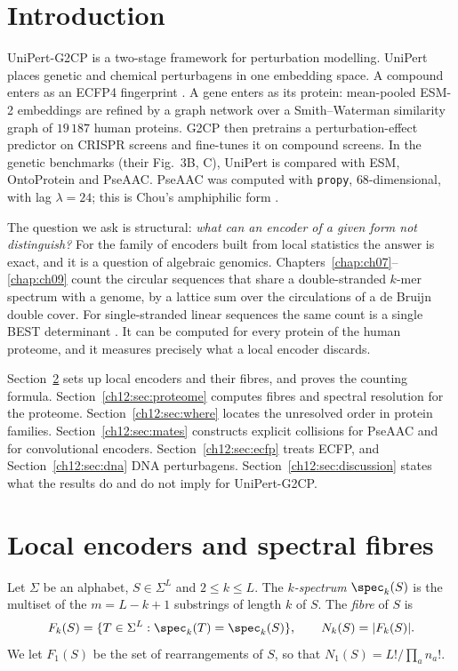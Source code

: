 \section{Introduction}\label{ch12:sec:intro}

UniPert-G2CP \cite{UniPert} is a two-stage framework for perturbation modelling. UniPert places genetic
and chemical perturbagens in one embedding space. A compound enters as an ECFP4 fingerprint
\cite{RH10}. A gene enters as its protein: mean-pooled ESM-2 embeddings \cite{ESM2} are refined by a
graph network over a Smith--Waterman similarity graph of $19\,187$ human proteins. G2CP then pretrains a
perturbation-effect predictor on CRISPR screens and fine-tunes it on compound screens. In the genetic
benchmarks (their Fig.~3B, C), UniPert is compared with ESM, OntoProtein and PseAAC. PseAAC was computed
with \texttt{propy}, $68$-dimensional, with lag $\lambda=24$; this is Chou's amphiphilic form
\cite{Chou01,Chou05}.

The question we ask is structural: \emph{what can an encoder of a given form not distinguish?} For
the family of encoders built from local statistics the answer is exact, and it is a question of
algebraic genomics. Chapters~\ref{chap:ch07}--\ref{chap:ch09} count the circular sequences that share a double-stranded
$k$-mer spectrum with a genome, by a lattice sum over the circulations of a de Bruijn double cover. For single-stranded linear sequences the same count is a single BEST
determinant \cite{BEST}. It can be computed for every protein of the human proteome, and it measures
precisely what a local encoder discards.

Section~\ref{ch12:sec:fibres} sets up local encoders and their fibres, and proves the counting formula.
Section~\ref{ch12:sec:proteome} computes fibres and spectral resolution for the proteome.
Section~\ref{ch12:sec:where} locates the unresolved order in protein families. Section~\ref{ch12:sec:mates}
constructs explicit collisions for PseAAC and for convolutional encoders. Section~\ref{ch12:sec:ecfp}
treats ECFP, and Section~\ref{ch12:sec:dna} DNA perturbagens. Section~\ref{ch12:sec:discussion} states what
the results do and do not imply for UniPert-G2CP.

\section{Local encoders and spectral fibres}\label{ch12:sec:fibres}

Let $\Sigma$ be an alphabet, $S\in\Sigma^L$ and $2\le k\le L$. The \emph{$k$-spectrum} $\spec_k(S)$ is the
multiset of the $m=L-k+1$ substrings of length $k$ of $S$. The \emph{fibre} of $S$ is
\[
F_k(S)=\{T\in\Sigma^{L}:\spec_k(T)=\spec_k(S)\},\qquad N_k(S)=|F_k(S)| .
\]
We let $F_1(S)$ be the set of rearrangements of $S$, so that $N_1(S)=L!/\prod_a n_a!$.


